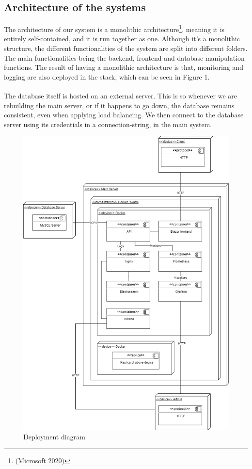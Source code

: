 \documentclass{article}
\begin{document}
\subsection{Architecture of the systems} 
The architecture of our system is a monolithic architecture\footnote{(Microsoft 2020)}, meaning it is entirely self-contained, and it is run together as one. Although it's a monolithic structure, the different functionalities of the system are split into different folders. The main functionalities being the backend, frontend and database manipulation functions. The result of having a monolithic architecture is that, monitoring and logging are also deployed in the stack, which can be seen in Figure 1.
\\\\
The database itself is hosted on an external server. This is so whenever we are rebuilding the main server, or if it happens to go down, the database remains consistent, even when applying load balancing. We then connect to the database server using its credentials in a connection-string, in the main system.

\newpage
\begin{figure}[h!]
\centering
\includegraphics[width= \textwidth]{images/DeploymentDiagram.png}
\caption{Deployment diagram}
\end{figure}
\end{document}
